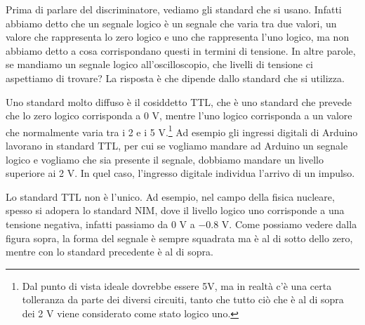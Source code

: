 Prima di parlare del discriminatore, vediamo gli standard che si usano. Infatti abbiamo detto che un segnale logico è un segnale che varia tra due valori, un valore che rappresenta lo zero logico e uno che rappresenta l'uno logico, ma non abbiamo detto a cosa corrispondano questi in termini di tensione. In altre parole, se mandiamo un segnale logico all'oscilloscopio, che livelli di tensione ci aspettiamo di trovare? La risposta è che dipende dallo standard che si utilizza.
\begin{figure}[H]
   \centering
\end{figure}

Uno standard molto diffuso è il cosiddetto TTL, che è uno standard che prevede che lo zero logico corrisponda a 0 V, mentre l'uno logico corrisponda a un valore che normalmente varia tra i 2 e i 5 V.\footnote{Dal punto di vista ideale dovrebbe essere 5V, ma in realtà c'è una certa tolleranza da parte dei diversi circuiti, tanto che tutto ciò che è al di sopra dei 2 V viene considerato come stato logico uno.} Ad esempio gli ingressi digitali di Arduino lavorano in standard TTL, per cui se vogliamo mandare ad Arduino un segnale logico e vogliamo che sia presente il segnale, dobbiamo mandare un livello superiore ai 2 V. In quel caso, l'ingresso digitale individua l'arrivo di un impulso.

Lo standard TTL non è l'unico. Ad esempio, nel campo della fisica nucleare, spesso si adopera lo standard NIM, dove il livello logico uno corrisponde a una tensione negativa, infatti passiamo da 0 V a $-0.8$ V. Come possiamo vedere dalla figura sopra, la forma del segnale è sempre squadrata ma è al di sotto dello zero, mentre con lo standard precedente è al di sopra.

